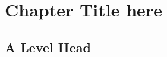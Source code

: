 \documentclass{book}
\begin{document}
\chapter{Chapter Title here}
\lipsum[1]
\section{A Level Head}
\lipsum[2-3]
\lipsum[4-12]
\end{document}
